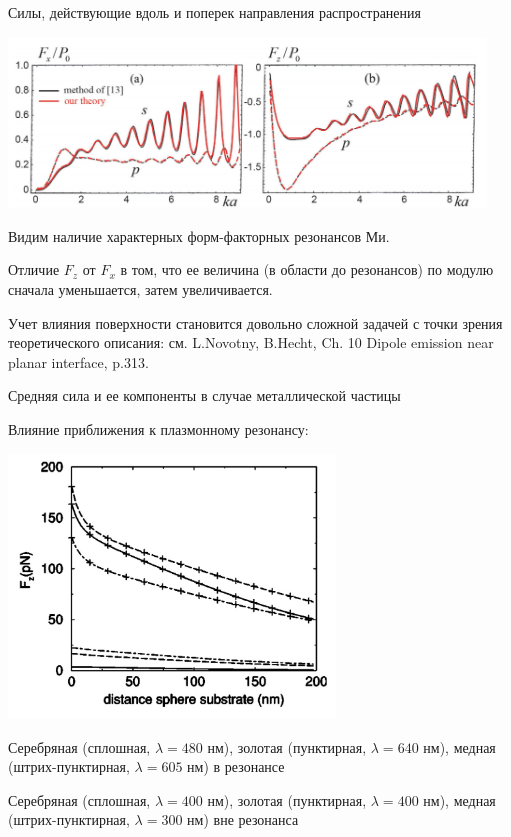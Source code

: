 \documentclass[9pt, compress, xcolor=table]{beamer}
\begin{document}
\begin{frame}{Силы, действующие вдоль и поперек направления распространения}

\begin{center}
\includegraphics[width=0.95\textwidth]{bliokh4}
\end{center}

Видим наличие характерных форм-факторных резонансов Ми. 

Отличие $F_z$ от $F_x$  в том, что ее величина (в области до резонансов) по модулю сначала уменьшается, затем увеличивается.

Учет влияния поверхности становится довольно сложной задачей с точки зрения теоретического описания: см. L.Novotny, B.Hecht, Ch. 10 Dipole emission near planar interface, p.313.

\end{frame}

\begin{frame}{Средняя сила и ее компоненты в случае металлической частицы}

Влияние приближения к плазмонному резонансу:

\begin{center}
\includegraphics[width=0.65\textwidth]{force}
\end{center}

\small{Серебряная (сплошная,  $\lambda=480$ нм), золотая (пунктирная, $\lambda=640$ нм), медная (штрих-пунктирная, $\lambda=605$ нм) в резонансе}

\small{Серебряная (сплошная,  $\lambda=400$ нм), золотая (пунктирная, $\lambda=400$ нм), медная (штрих-пунктирная, $\lambda=300$ нм) вне резонанса}

\end{frame}
\end{document}
